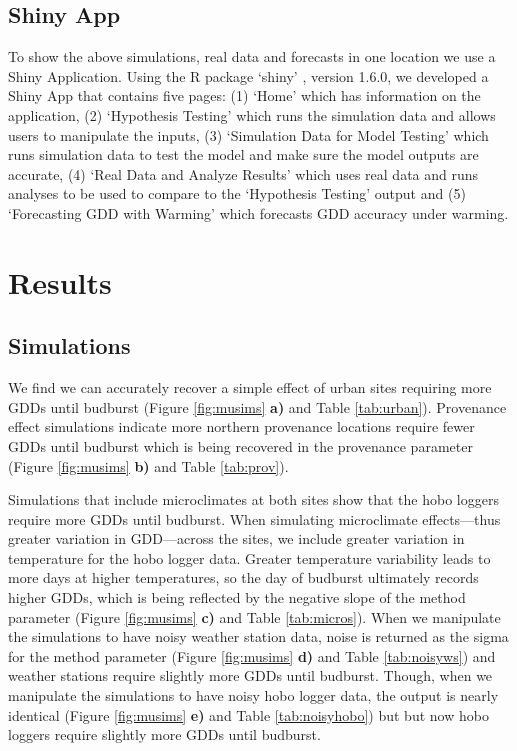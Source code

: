 \documentclass{article}\usepackage[]{graphicx}\usepackage[]{color}
\begin{document}
\subsection*{Shiny App}
To show the above simulations, real data and forecasts in one location we use a Shiny Application. Using the R package `shiny' \citep{shiny2021}, version 1.6.0, we developed a Shiny App that contains five pages: (1) `Home' which has information on the application, (2) `Hypothesis Testing' which runs the simulation data and allows users to manipulate the inputs, (3) `Simulation Data for Model Testing' which runs simulation data to test the model and make sure the model outputs are accurate, (4) `Real Data and Analyze Results' which uses real data and runs analyses to be used to compare to the `Hypothesis Testing' output and (5) `Forecasting GDD with Warming' which forecasts GDD accuracy under warming. 

\section*{Results}
\subsection*{Simulations}
We find we can accurately recover a simple effect of urban sites requiring more GDDs until budburst (Figure \ref{fig:musims} \textbf{a)} and Table \ref{tab:urban}). Provenance effect simulations indicate more northern provenance locations require fewer GDDs until budburst which is being recovered in the provenance parameter (Figure \ref{fig:musims} \textbf{b)} and Table \ref{tab:prov}). 

Simulations that include microclimates at both sites show that the hobo loggers require more GDDs until budburst. When simulating microclimate effects---thus greater variation in GDD---across the sites, we include greater variation in temperature for the hobo logger data. Greater temperature variability leads to more days at higher temperatures, so the day of budburst ultimately records higher GDDs, which is being reflected by the negative slope of the method parameter (Figure \ref{fig:musims} \textbf{c)} and Table \ref{tab:micros}). When we manipulate the simulations to have noisy weather station data, noise is returned as the sigma for the method parameter (Figure \ref{fig:musims} \textbf{d)} and Table \ref{tab:noisyws}) and weather stations require slightly more GDDs until budburst. Though, when we manipulate the simulations to have noisy hobo logger data, the output is nearly identical (Figure \ref{fig:musims} \textbf{e)} and Table \ref{tab:noisyhobo}) but but now hobo loggers require slightly more GDDs until budburst.
  
\end{document}
